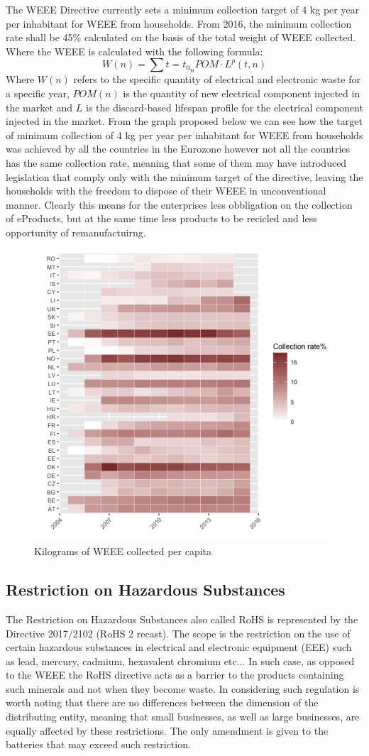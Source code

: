 \documentclass{article}
\begin{document}
  The WEEE Directive currently sets a minimum collection target of 4 kg per year per inhabitant for WEEE from households. From 2016, the minimum collection rate shall be 45\% calculated on the basis of the total weight of WEEE collected. Where the WEEE is calculated with the following formula:
  $$
  W (n) = \sum{t = t_0}_{n} POM \cdot L^p(t,n)
  $$
  Where $W(n)$ refers to the specific quantity of electrical and electronic waste for a specific year, $POM(n)$ is the quantity of new electrical component injected in the market and $L$ is the discard-based lifespan profile for the electrical component injected in the market. From the graph proposed below we can see how the target of minimum collection of 4 kg per year per inhabitant for WEEE from households was achieved by all the countries in the Eurozone however not all the countries has the same collection rate, meaning that some of them may have introduced legislation that comply only with the minimum target of the directive, leaving the households with the freedom to dispose of their WEEE in unconventional manner. Clearly this means for the enterprises less obbligation on the collection of eProducts, but at the same time less products to be recicled and less opportunity of remanufactuirng.

  \begin{figure}
  \centering
  \includegraphics[width=0.5\linewidth]{Images/heatmap.png}
  \caption{Kilograms of WEEE collected per capita}
  \end{figure}

\subsection{Restriction on Hazardous Substances}
  The Restriction on Hazardous Substances also called RoHS is represented by the Directive 2017/2102 (RoHS 2 recast). The scope is the restriction on the use of certain hazardous substances in electrical and electronic equipment (EEE) such as lead, mercury, cadmium, hexavalent chromium etc... In such case, as opposed to the WEEE the RoHS directive acts as a barrier to the products containing such minerals and not when they become waste. In considering such regulation is worth noting that there are no differences between the dimension of the distributing entity, meaning that small businesses, as well as large businesses, are equally affected by these restrictions. The only amendment is given to the batteries that may exceed such restriction.
\end{document}

